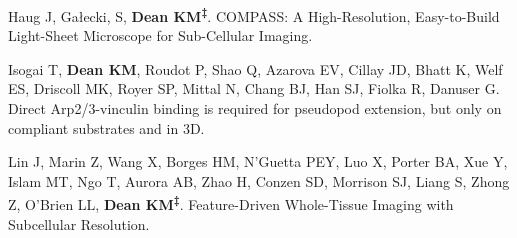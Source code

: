 \begin{etaremune}

\item Haug J, Gałecki, S, \textbf{Dean KM\textsuperscript{‡}}. COMPASS: A High-Resolution, Easy-to-Build Light-Sheet Microscope for Sub-Cellular Imaging.

\item Isogai T, \textbf{Dean KM}, Roudot P, Shao Q, Azarova EV, Cillay JD, Bhatt K, Welf ES, Driscoll MK, Royer SP, Mittal N, Chang BJ, Han SJ, Fiolka R, Danuser G. Direct Arp2/3-vinculin binding is required for pseudopod extension, but only on compliant substrates and in 3D. 

\item Lin J, Marin Z, Wang X, Borges HM, N’Guetta PEY, Luo X, Porter BA, Xue Y, Islam MT, Ngo T, Aurora AB, Zhao H, Conzen SD, Morrison SJ, Liang S, Zhong Z, O’Brien LL, \textbf{Dean KM\textsuperscript{‡}}. Feature-Driven Whole-Tissue Imaging with Subcellular Resolution. 

\end{etaremune}
